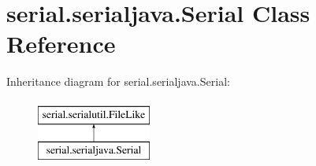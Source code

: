 \hypertarget{classserial_1_1serialjava_1_1_serial}{}\section{serial.\+serialjava.\+Serial Class Reference}
\label{classserial_1_1serialjava_1_1_serial}
Inheritance diagram for serial.\+serialjava.\+Serial\+:\begin{figure}[H]
\begin{center}
\leavevmode
\includegraphics[height=2.000000cm]{classserial_1_1serialjava_1_1_serial}
\end{center}
\end{figure}
